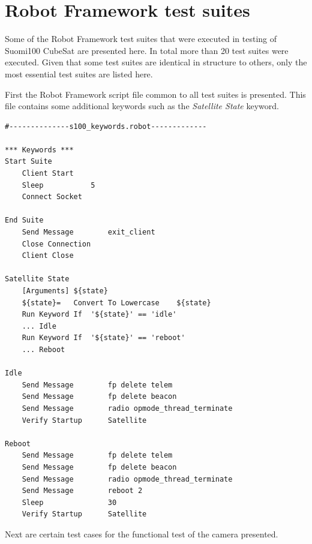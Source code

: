 \documentclass[english,12pt,a4paper,pdftex,elec,utf8]{aaltothesis}
\begin{document}
\section{Robot Framework test suites\label{LiiteB}}
Some of the Robot Framework test suites that were executed in testing of Suomi100 CubeSat are presented here. In total more than 20 test suites were executed. Given that some test suites are identical in structure to others, only the most essential test suites are listed here.\par
First the Robot Framework script file common to all test suites is presented. This file contains some additional keywords such as the \textit{Satellite State} keyword.
\begin{verbatim}
#--------------s100_keywords.robot-------------

*** Keywords ***
Start Suite
	Client Start
	Sleep			5
	Connect Socket
	
End Suite
	Send Message		exit_client
	Close Connection	
	Client Close
		
Satellite State
	[Arguments]	${state}
	${state}=	Convert To Lowercase	${state}
	Run Keyword If	'${state}' == 'idle'
	...	Idle
	Run Keyword If	'${state}' == 'reboot'
	...	Reboot
	
Idle
	Send Message		fp delete telem
	Send Message		fp delete beacon
	Send Message		radio opmode_thread_terminate
	Verify Startup		Satellite

Reboot
	Send Message		fp delete telem
	Send Message		fp delete beacon
	Send Message		radio opmode_thread_terminate
	Send Message		reboot 2
	Sleep				30
	Verify Startup		Satellite

\end{verbatim} 
Next are certain test cases for the functional test of the camera presented.
\end{document}

